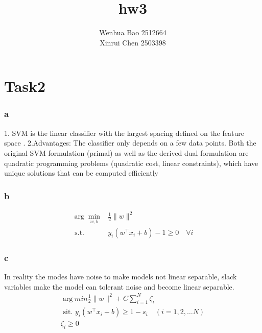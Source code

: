 \documentclass{article}
\title{hw3}
\author{Wenhua Bao 2512664\\Xinrui Chen 2503398}
\begin{document}
\maketitle
\section{Task2}
\subsubsection{a}
1. SVM is the linear classifier with the largest spacing defined on the feature space .
2.Advantages: The classifier only depends on a few data points.
              Both the original SVM formulation (primal) as well as the
              derived dual formulation are quadratic programming problems
              (quadratic cost, linear constraints), which have unique solutions
              that can be computed efficiently
\subsubsection{b}
$$\begin{aligned}
\arg \min _{w, b} & \frac{1}{2}\|w\|^{2} \\
\text { s.t. } & y_{i}\left(w^{\top} x_{i}+b\right)-1 \geqslant 0 \quad \forall i
\end{aligned}$$
\subsubsection{c}
In reality the modes have noise to make models not linear separable, slack variables make the model can tolerant noise and become linear separable.
$$\begin{array}{l}
\arg min \frac{1}{2}\|w\|^{2}+C \sum_{i=1}^{N} \zeta_{i} \\
\text { sit. } y_{i}\left(w^{\top} x_{i}+b\right) \geqslant 1-s_{i} \quad(i=1,2, \ldots N) \\
\zeta_{i} \geqslant 0
\end{array}$$
\end{document}
